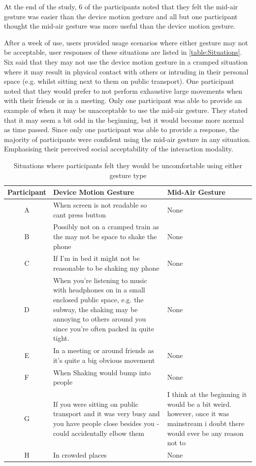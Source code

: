 \documentclass{l4proj}
\begin{document}
At the end of the study, 6 of the participants noted that they felt the mid-air gesture was easier than the device motion gesture and all but one participant thought the mid-air gesture was more useful than the device motion gesture.

After a week of use, users provided usage scenarios where either gesture may not be acceptable, user responses of these situations are listed in \autoref{table:Situations}. Six said that they may not use the device motion gesture in a cramped situation where it may result in physical contact with others or intruding in their personal space (e.g. whilst sitting next to them on public transport). One participant noted that they would prefer to not perform exhaustive large movements when with their friends or in a meeting. Only one participant was able to provide an example of when it may be unacceptable to use the mid-air gesture. They stated that it may seem a bit odd in the beginning, but it would become more normal as time passed. Since only one participant was able to provide a response, the majority of participants were confident using the mid-air gesture in any situation. Emphasising their perceived social acceptability of the interaction modality.

\begin{table}[h!]
    \centering
    \begin{tabular}{ | c | m{5cm} | m{5cm} | }
	    \hline
	    Participant & Device Motion Gesture & Mid-Air Gesture\\
	    \hline
        A & When screen is not readable so cant press button & None\\
	    \hline
        B & Possibly not on a cramped train as the may not be space to shake the phone & None\\
	    \hline
	    C & If I'm in bed it might not be reasonable to be shaking my phone & None\\
	    \hline
	    D & When you're listening to music with headphones on in a small enclosed public space, e.g. the subway, the shaking may be annoying to others around you since you're often packed in quite tight. & None\\
	    \hline
	    E & In a meeting or around friends as it's quite a big obvious movement & None\\
	    \hline
	    F & When Shaking would bump into people & None\\
	    \hline
	    G & If you were sitting on public transport and it was very busy and you have people close besides you - could accidentally elbow them & I think at the beginning it would be a bit weird. however, once it was mainstream i doubt there would ever be any reason not to\\
	    \hline
	    H & In crowded places & None\\
	    \hline
    \end{tabular}
    \caption{Situations where participants felt they would be uncomfortable using either gesture type}
    \label{table:Situations}
\end{table}
\end{document}
